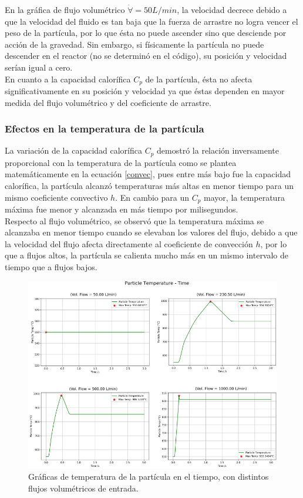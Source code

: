 \documentclass[11pt,stdletter,orderfromtodate,sigleft,twoside]{report}
\begin{document}
En la gráfica de flujo volumétrico $\dot{\forall}=50 L/min$, la velocidad decrece debido a que la velocidad del fluido es tan baja que la fuerza de arrastre no logra vencer el peso de la partícula, por lo que ésta no puede ascender sino que desciende por acción de la gravedad. Sin embargo, si físicamente la partícula no puede descender en el reactor (no se determinó en el código), su posición y velocidad serían igual a cero.\\

En cuanto a la capacidad calorífica $C_p$ de la partícula, ésta no afecta significativamente en su posición y velocidad ya que éstas dependen en mayor medida del flujo volumétrico y del coeficiente de arrastre.


\subsubsection{Efectos en la temperatura de la partícula}

La variación de la capacidad calorífica $C_p$ demostró la relación inversamente proporcional con la temperatura de la partícula como se plantea matemáticamente en la ecuación \ref{convec}, pues entre más bajo fue la capacidad calorífica, la partícula alcanzó temperaturas más altas en menor tiempo para un mismo coeficiente convectivo $h$. En cambio para un $C_p$ mayor, la temperatura máxima fue menor y alcanzada en más tiempo por milisegundos.\\

Respecto al flujo volumétrico, se observó que la temperatura máxima se alcanzaba en menor tiempo cuando se elevaban los valores del flujo, debido a que la velocidad del flujo afecta directamente al coeficiente de convección $h$, por lo que a flujos altos, la partícula se calienta mucho más en un mismo intervalo de tiempo que a flujos bajos.\\

\begin{figure}[H]
    \centering
    \includegraphics[width=0.7\linewidth]{figures/Temp1.png}
    \caption{Gráficas de temperatura de la partícula en el tiempo, con distintos flujos volumétricos de entrada.}
    \label{fig:enter-label}
\end{figure}
\end{document}
